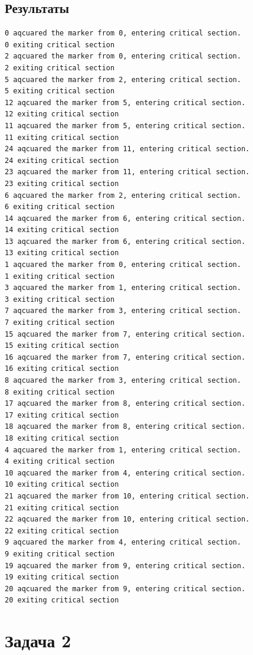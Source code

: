 \documentclass[a4paper,12pt,titlepage,final]{article}
\begin{document}
\subsection{Результаты}
\begin{verbatim}
0 aqcuared the marker from 0, entering critical section.
0 exiting critical section
2 aqcuared the marker from 0, entering critical section.
2 exiting critical section
5 aqcuared the marker from 2, entering critical section.
5 exiting critical section
12 aqcuared the marker from 5, entering critical section.
12 exiting critical section
11 aqcuared the marker from 5, entering critical section.
11 exiting critical section
24 aqcuared the marker from 11, entering critical section.
24 exiting critical section
23 aqcuared the marker from 11, entering critical section.
23 exiting critical section
6 aqcuared the marker from 2, entering critical section.
6 exiting critical section
14 aqcuared the marker from 6, entering critical section.
14 exiting critical section
13 aqcuared the marker from 6, entering critical section.
13 exiting critical section
1 aqcuared the marker from 0, entering critical section.
1 exiting critical section
3 aqcuared the marker from 1, entering critical section.
3 exiting critical section
7 aqcuared the marker from 3, entering critical section.
7 exiting critical section
15 aqcuared the marker from 7, entering critical section.
15 exiting critical section
16 aqcuared the marker from 7, entering critical section.
16 exiting critical section
8 aqcuared the marker from 3, entering critical section.
8 exiting critical section
17 aqcuared the marker from 8, entering critical section.
17 exiting critical section
18 aqcuared the marker from 8, entering critical section.
18 exiting critical section
4 aqcuared the marker from 1, entering critical section.
4 exiting critical section
10 aqcuared the marker from 4, entering critical section.
10 exiting critical section
21 aqcuared the marker from 10, entering critical section.
21 exiting critical section
22 aqcuared the marker from 10, entering critical section.
22 exiting critical section
9 aqcuared the marker from 4, entering critical section.
9 exiting critical section
19 aqcuared the marker from 9, entering critical section.
19 exiting critical section
20 aqcuared the marker from 9, entering critical section.
20 exiting critical section
\end{verbatim}
\newpage
\section{Задача 2}
\end{document}
